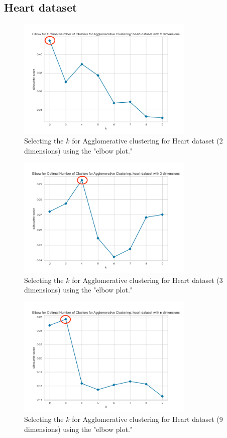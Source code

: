 \subsection{Heart dataset}
\begin{figure}[H]
  \includegraphics[width=0.75\textwidth]{Method/images/k-values/heart-dataset-2-agglomerative.png}
  \caption{Selecting the $k$ for Agglomerative clustering for Heart dataset (2 dimensions) using the "elbow plot."}
  \label{hyperparameters:agglomerative-heart-dataset-2d}
\end{figure}
\begin{figure}[H]
  \includegraphics[width=0.75\textwidth]{Method/images/k-values/heart-dataset-3-agglomerative.png}
  \caption{Selecting the $k$ for Agglomerative clustering for Heart dataset (3 dimensions) using the "elbow plot."}
  \label{hyperparameters:agglomerative-heart-dataset-3d}
\end{figure}
\begin{figure}[H]
  \includegraphics[width=0.75\textwidth]{Method/images/k-values/heart-dataset-n-agglomerative.png}
  \caption{Selecting the $k$ for Agglomerative clustering for Heart dataset (9 dimensions) using the "elbow plot."}
  \label{hyperparameters:agglomerative-heart-dataset-9d}
\end{figure}
\newpage

